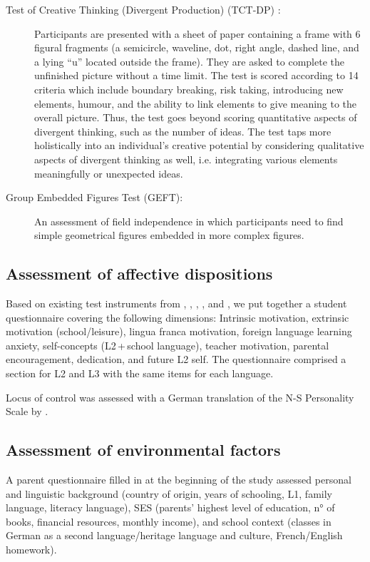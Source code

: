 \documentclass[output=paper]{langsci/langscibook}
\begin{document}
\begin{description}
\item[Test of Creative Thinking (Divergent Production) (TCT-DP) {\upshape\citep{UrbanJellen1995}}:] Participants are presented with a sheet of paper containing a frame with 6 figural fragments (a semicircle, waveline, dot, right angle, dashed line, and a lying “u” located outside the frame). They are asked to complete the unfinished picture without a time limit. The test is scored according to 14 criteria which include boundary breaking, risk taking, introducing new elements, humour, and the ability to link elements to give meaning to the overall picture. Thus, the test goes beyond scoring quantitative aspects of divergent thinking, such as the number of ideas. The test taps more holistically into an individual’s creative potential by considering qualitative aspects of divergent thinking as well, i.e. integrating various elements meaningfully or unexpected ideas.

\item[Group Embedded Figures Test (GEFT):] An assessment of field independence \citep{WitkinEtAl2014} in which participants need to find simple geometrical figures embedded in more complex figures.
\end{description}

\subsection{Assessment of affective dispositions}
\begin{sloppypar}
Based on existing test instruments from \citet{HorwitzEtAl1986}, \citet{Stoeckli2004}, \citet{Doernyei2010ErsterEintrag}, \citet{Heinzmann2013}, and \citet{PeyerEtAl2016}, we put together a student questionnaire covering the following dimensions: Intrinsic motivation, extrinsic motivation (school/leisure), lingua franca motivation, foreign language learning anxiety, self-concepts (L2\,+\,school language), teacher motivation, parental encouragement, dedication, and future L2 self. The questionnaire comprised a section for L2 and L3 with the same items for each language. 
\end{sloppypar}

Locus of control was assessed with a German translation of the N-S Personality Scale by \citet{NowickiStrickland1973}.

\subsection{Assessment of environmental factors}
A parent questionnaire filled in at the beginning of the study assessed personal and linguistic background (country of origin, years of schooling, L1, family language, literacy language), SES (parents’ highest level of education, n° of books, financial resources, monthly income), and school context (classes in German as a second language\slash heritage language and culture, French/English homework).
\end{document}
